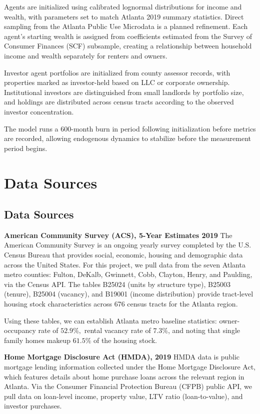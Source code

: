 \documentclass[twocolumn,showpacs,%
  nofootinbib,aps,superscriptaddress,%
  eqsecnum,prd,notitlepage,showkeys,10pt]{revtex4-1}
\begin{document}
Agents are initialized using calibrated lognormal distributions for income and wealth, with parameters set to match Atlanta 2019 summary statistics. Direct sampling from the Atlanta Public Use Microdata is a planned refinement. Each agent's starting wealth is assigned from coefficients estimated from the Survey of Consumer Finances (SCF) subsample, creating a relationship between household income and wealth separately for renters and owners. \newline

Investor agent portfolios are initialized from county assessor records, with properties marked as investor-held based on LLC or corporate ownership. Institutional investors are distinguished from small landlords by portfolio size, and holdings are distributed across census tracts according to the observed investor concentration. \newline

The model runs a 600-month burn in period following initialization before metrics are recorded, allowing endogenous dynamics to stabilize before the measurement period begins. 

\section{Data Sources}
\subsection{Data Sources}
\textbf{American Community Survey (ACS), 5-Year Estimates 2019}
The American Community Survey is an ongoing yearly survey completed by the U.S. Census Bureau that provides social, economic, housing and demographic data across the United States. For this project, we pull data from the seven Atlanta metro counties: Fulton, DeKalb, Gwinnett, Cobb, Clayton, Henry, and Paulding, via the Census API. The tables B25024 (units by structure type), B25003 (tenure), B25004 (vacancy), and B19001 (income distribution) provide tract-level housing stock characteristics across 676 census tracts for the Atlanta region. \newline

Using these tables, we can establish Atlanta metro baseline statistics: owner-occupancy rate of $52.9\%,$ rental vacancy rate of $7.3\%$, and noting that single family homes makeup $61.5\%$ of the housing stock. \newline

\textbf{Home Mortgage Disclosure Act (HMDA), 2019}
HMDA data is public mortgage lending information collected under the Home Mortgage Disclosure Act, which features details about home purchase loans across the relevant region in Atlanta. Via the Consumer Financial Protection Bureau (CFPB) public API, we pull data on loan-level income, property value, LTV ratio (loan-to-value), and investor purchases. \newline
\end{document}
